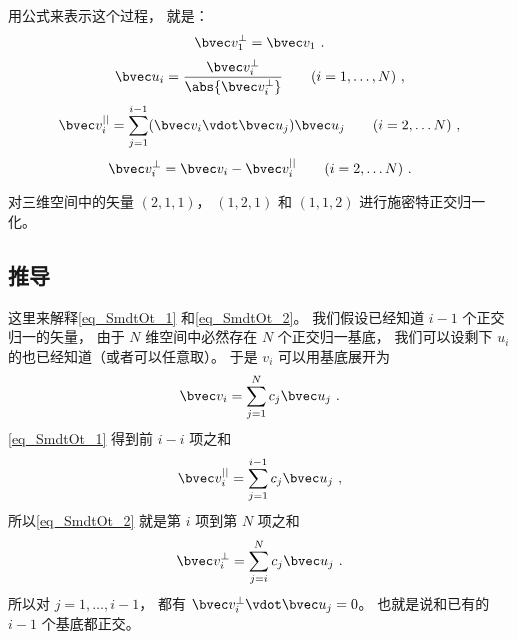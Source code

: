 用公式来表示这个过程， 就是：
\begin{equation}
\bvec v_1^\bot = \bvec v_1~.
\end{equation}
\begin{equation}
\bvec u_i = \frac{\bvec v_i^\bot}{\abs{\bvec v_i^\bot}} \qquad (i = 1, \dots ,N)~,
\end{equation}
\begin{equation}\label{eq_SmdtOt_1}
\bvec v_i^{||} = \sum _{j=1}^{i-1} (\bvec v_i \vdot \bvec u_j) \bvec u_j \qquad (i = 2, \dots N)~,
\end{equation}
\begin{equation}\label{eq_SmdtOt_2}
\bvec v_i^\bot = \bvec v_i - \bvec v_i^{||} \qquad (i = 2, \dots N)~.
\end{equation}

\begin{exercise}{}
对三维空间中的矢量 $(2, 1, 1)$， $(1, 2, 1)$ 和 $(1, 1, 2)$ 进行施密特正交归一化。
\end{exercise}

\subsection{推导}
这里来解释\autoref{eq_SmdtOt_1} 和\autoref{eq_SmdtOt_2}。 我们假设已经知道 $i-1$ 个正交归一的矢量， 由于 $N$ 维空间中必然存在 $N$ 个正交归一基底， 我们可以设剩下 $u_i$ 的也已经知道（或者可以任意取）。 于是 $v_i$ 可以用基底展开为
\begin{equation}
\bvec v_i = \sum _{j=1}^N c_j \bvec u_j~.
\end{equation}
\autoref{eq_SmdtOt_1} 得到前 $i-i$ 项之和
\begin{equation}
\bvec v_i^{||} = \sum _{j=1}^{i-1} c_j\bvec u_j~,
\end{equation}
所以\autoref{eq_SmdtOt_2} 就是第 $i$ 项到第 $N$ 项之和
\begin{equation}
\bvec v_i^\bot = \sum _{j=i}^{N} c_j\bvec u_j~.
\end{equation}
所以对 $j = 1, \dots , i-1$， 都有 $\bvec v_i^\bot \vdot \bvec u_j = 0$。 也就是说和已有的 $i-1$ 个基底都正交。